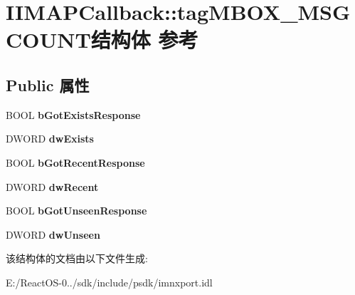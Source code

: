 \hypertarget{struct_i_i_m_a_p_callback_1_1tag_m_b_o_x___m_s_g_c_o_u_n_t}{}\section{I\+I\+M\+A\+P\+Callback\+:\+:tag\+M\+B\+O\+X\+\_\+\+M\+S\+G\+C\+O\+U\+N\+T结构体 参考}
\label{struct_i_i_m_a_p_callback_1_1tag_m_b_o_x___m_s_g_c_o_u_n_t}
\subsection*{Public 属性}
\begin{DoxyCompactItemize}
\item 
\mbox{\label{struct_i_i_m_a_p_callback_1_1tag_m_b_o_x___m_s_g_c_o_u_n_t_ac2d8eabdc7e3b387f391070d690bffdd}} 
B\+O\+OL {\bfseries b\+Got\+Exists\+Response}
\item 
\mbox{\label{struct_i_i_m_a_p_callback_1_1tag_m_b_o_x___m_s_g_c_o_u_n_t_a785feb18b36a858cc6c759939399b066}} 
D\+W\+O\+RD {\bfseries dw\+Exists}
\item 
\mbox{\label{struct_i_i_m_a_p_callback_1_1tag_m_b_o_x___m_s_g_c_o_u_n_t_ae5a574ecf3c2a5546f5fe3f4ee0bb9ac}} 
B\+O\+OL {\bfseries b\+Got\+Recent\+Response}
\item 
\mbox{\label{struct_i_i_m_a_p_callback_1_1tag_m_b_o_x___m_s_g_c_o_u_n_t_a006cb1a206993dc01d4bb1d1b224b5e6}} 
D\+W\+O\+RD {\bfseries dw\+Recent}
\item 
\mbox{\label{struct_i_i_m_a_p_callback_1_1tag_m_b_o_x___m_s_g_c_o_u_n_t_a9ebe3b0d49ddd05b54afe4f15bc30e22}} 
B\+O\+OL {\bfseries b\+Got\+Unseen\+Response}
\item 
\mbox{\label{struct_i_i_m_a_p_callback_1_1tag_m_b_o_x___m_s_g_c_o_u_n_t_a0420342a80d10a589fa23138e0b8570d}} 
D\+W\+O\+RD {\bfseries dw\+Unseen}
\end{DoxyCompactItemize}


该结构体的文档由以下文件生成\+:\begin{DoxyCompactItemize}
\item 
E\+:/\+React\+O\+S-\/0../sdk/include/psdk/imnxport.\+idl\end{DoxyCompactItemize}
